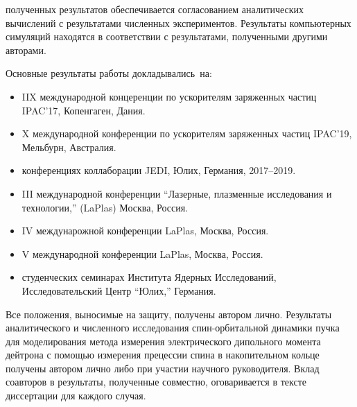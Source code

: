 {\reliability} полученных результатов обеспечивается согласованием аналитических вычислений с результатами численных экспериментов. Результаты компьютерных симуляций находятся в соответствии с результатами, полученными другими авторами.


{\probation}
Основные результаты работы докладывались~на:
\begin{itemize}
\item IIX международной концеренции по ускорителям заряженных частиц IPAC'17, Копенгаген, Дания.
\item X международной конференции по ускорителям заряженных частиц IPAC'19, Мельбурн, Австралия.
\item конференциях коллаборации JEDI, Юлих, Германия, 2017--2019.
\item III международной конференции ``Лазерные, плазменные исследования и технологии,'' (LaPlas) Москва, Россия. 
\item IV междунарожной конференции LaPlas, Москва, Россия.
\item V международной конференции LaPlas, Москва, Россия.
\item студенческих семинарах Института Ядерных Исследований, Исследовательский Центр ``Юлих,'' Германия.
\end{itemize}

{\contribution} Все положения, выносимые на защиту, получены автором лично. Результаты аналитического и численного исследования спин-орбитальной динамики пучка для моделирования метода измерения электрического дипольного момента дейтрона с помощью измерения прецессии спина в накопительном кольце получены автором лично либо при участии научного руководителя. Вклад соавторов в результаты, полученные совместно, оговаривается в тексте диссертации для каждого случая.


